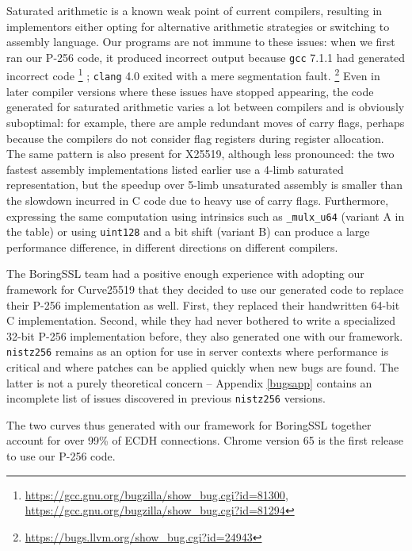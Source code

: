 \documentclass[conference,letterpaper]{IEEEtran}
\begin{document}
Saturated arithmetic is a known weak point of current compilers, resulting in implementors either opting for alternative arithmetic strategies or switching to assembly language.
Our programs are not immune to these issues: when we first ran our P-256 code, it produced incorrect output because \texttt{gcc} 7.1.1 had generated incorrect code%
\footnote{\url{https://gcc.gnu.org/bugzilla/show_bug.cgi?id=81300}, \url{https://gcc.gnu.org/bugzilla/show_bug.cgi?id=81294}}%
; \texttt{clang} 4.0 exited with a mere segmentation fault.%
\footnote{\url{https://bugs.llvm.org/show_bug.cgi?id=24943}}
Even in later compiler versions where these issues have stopped appearing, the code generated for saturated arithmetic varies a lot between compilers and is obviously suboptimal:
for example, there are ample redundant moves of carry flags, perhaps because the compilers do not consider flag registers during register allocation.
The same pattern is also present for X25519, although less pronounced: the two fastest assembly implementations listed earlier use a 4-limb saturated representation, but the speedup over 5-limb unsaturated assembly is smaller than the slowdown incurred in C code due to heavy use of carry flags.
Furthermore, expressing the same computation using intrinsics such as \verb|_mulx_u64| (variant A in the table) or using \texttt{uint128} and a bit shift (variant B) can produce a large performance difference, in different directions on different compilers.

The BoringSSL team had a positive enough experience with adopting our framework for Curve25519 that they decided to use our generated code to replace their P-256 implementation as well.
First, they replaced their handwritten 64-bit C implementation.
Second, while they had never bothered to write a specialized 32-bit P-256 implementation before, they also generated one with our framework.
\texttt{nistz256} remains as an option for use in server contexts where performance is critical and where patches can be applied quickly when new bugs are found.
The latter is not a purely theoretical concern -- Appendix \ref{bugsapp} contains an incomplete list of issues discovered in previous \texttt{nistz256} versions.

The two curves thus generated with our framework for BoringSSL together account for over 99\% of ECDH connections.
Chrome version 65 is the first release to use our P-256 code.
\end{document}
